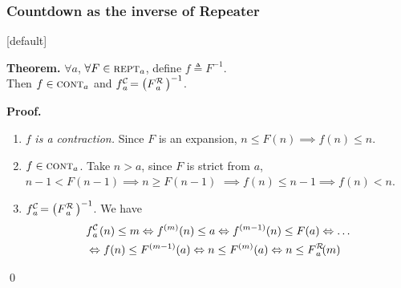 \begin{frame}
\frametitle{Countdown as the inverse of Repeater}
\setlength{\leftmargini}{3.8em}
[default]

\textbf{Theorem.} $\forall a$, $\forall F\in \text{\scshape{rept}}_a$, define $f\triangleq F^{-1}$. 
\\ Then $f\in \text{\scshape{cont}}_a$ and $\cdt{f}{a}~ = \left(\rf{F}{a}\ \right)^{-1}$.

\bigskip

\textbf{Proof.}

\begin{enumerate}
	\item $f$ \textit{is a contraction.} Since $F$ is an expansion, $n \le F(n)\implies f(n)\le n$.
	
	\item $f\in \text{\scshape{cont}}_a$. Take $n> a$, since $F$ is strict from $a$, $n-1 < F(n-1) \implies n\ge F(n-1)$ $\implies f(n)\le n - 1 \implies f(n) < n$.
	
	\item $\cdt{f}{a}~ = \left(\rf{F}{a}\ \right)^{-1}$. We have
	\begin{equation*} \label{eq: rf-upp-inv}
	\begin{aligned}
	& \cdt{f}{a}(n)\le m \iff f^{(m)}(n)\le a \iff f^{(m-1)}(n)\le F(a) \iff \ldots \\
	&  \iff f(n)\le F^{(m-1)}(a) \iff n\le F^{(m)}(a) \iff n\le \rf{F}{a}(m)
	\end{aligned}
	\vspace{-0.5em}
	\end{equation*}
\end{enumerate}
\qed

\end{frame}


